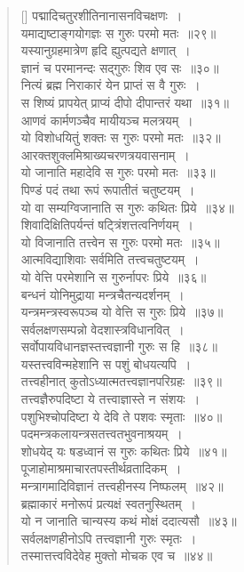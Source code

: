 \documentclass[twoside,12pt,notitlepage]{book}
\begin{document}
\begin{verse}[\versewidth]
पद्मादिचतुरशीतिनानासनविचक्षणः~।\\[-6pt]
यमाद्यष्टाङ्गयोगज्ञः स गुरुः परमो मतः~॥२९॥\footA \\
यस्यानुग्रहमात्रेण हृदि ह्युत्पद्यते क्षणात्~।\\[-6pt]
ज्ञानं च परमानन्दः सद्गुरुः शिव एव सः~॥३०॥\\
नित्यं ब्रह्म निराकारं येन प्राप्तं स वै गुरुः~।\\[-6pt]
स शिष्यं प्रापयेत् प्राप्यं दीपो दीपान्तरं यथा~॥३१॥\\
आणवं कार्मणञ्चैव मायीयञ्च मलत्रयम्~।\\[-6pt]
यो विशोधयितुं शक्तः स गुरुः परमो मतः~॥३२॥\footA \\
आरक्तशुक्लमिश्राख्यचरणत्रयवासनाम्~।\\[-6pt]
यो जानाति महादेवि स गुरुः परमो मतः~॥३३॥\footA \\
पिण्डं पदं तथा रूपं रूपातीतं चतुष्टयम्~।\\[-6pt]
यो वा सम्यग्विजानाति स गुरुः कथितः प्रिये~॥३४॥\footA \\
शिवादिक्षितिपर्यन्तं षट्त्रिंशत्तत्वनिर्णयम्~।\\[-6pt]
यो विजानाति तत्त्वेन स गुरुः परमो मतः~॥३५॥\footA \\
आत्मविद्याशिवाः सर्वमिति तत्त्वचतुष्टयम्~।\\[-6pt]
यो वेत्ति परमेशानि स गुरुर्नापरः प्रिये~॥३६॥\footA \\
बन्धनं योनिमुद्राया मन्त्रचैतन्यदर्शनम्~।\\[-6pt]
यन्त्रमन्त्रस्वरूपञ्च यो वेत्ति स गुरुः प्रिये~॥३७॥\\
सर्वलक्षणसम्पन्नो वेदशास्त्रविधानवित्~।\\[-6pt]
सर्वोपायविधानज्ञस्तत्त्वज्ञानी गुरुः स हि~॥३८॥\\
यस्तत्त्वविन्महेशानि स पशुं बोधयत्यपि~।\\[-6pt]
तत्त्वहीनात् कुतोऽध्यात्मतत्त्वज्ञानपरिग्रहः~॥३९॥\\
तत्त्वज्ञैरुपदिष्टा ये तत्त्वाज्ञास्ते न संशयः~।\\[-6pt]
पशुभिश्चोपदिष्टा ये देवि ते पशवः स्मृताः~॥४०॥\\
पदमन्त्रकलायन्त्रसतत्त्वतभुवनाश्रयम्~।\\[-6pt]
शोधयेद् यः षडध्वानं स गुरुः कथितः प्रिये~॥४१॥\footA \\
पूजाहोमाश्रमाचारतपस्तीर्थव्रतादिकम्~।\\[-6pt]
मन्त्रागमादिविज्ञानं तत्त्वहीनस्य निष्फलम्~॥४२॥\\
ब्रह्माकारं मनोरूपं प्रत्यक्षं स्वतनुस्थितम्~।\\[-6pt]
यो न जानाति चान्यस्य कथं मोक्षं ददात्यसौ~॥४३॥\\
सर्वलक्षणहीनोऽपि तत्त्वज्ञानी गुरुः स्मृतः~।\\[-6pt]
तस्मात्तत्त्वविदेवेह मुक्तो मोचक एव च~॥४४॥\footA 
\end{verse}
\end{document}
